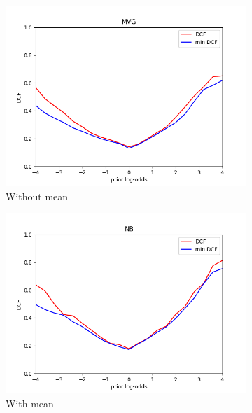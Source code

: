 \begin{figure}[h!]
    \centering
    \begin{subfigure}[b]{0.4\linewidth}
        \includegraphics[width=\linewidth]{Lab/07. Lab 07/Images/01. MVG}
        \caption{Without mean}
        \label{fig:dcfMVG}
    \end{subfigure}
    \begin{subfigure}[b]{0.4\linewidth}
        \includegraphics[width=\linewidth]{Lab/07. Lab 07/Images/02. Naive Bayes}
        \caption{With mean}
        \label{fig:dcfNB}
    \end{subfigure}
    \begin{subfigure}[b]{0.4\linewidth}

\end{subfigure}
\end{figure}
